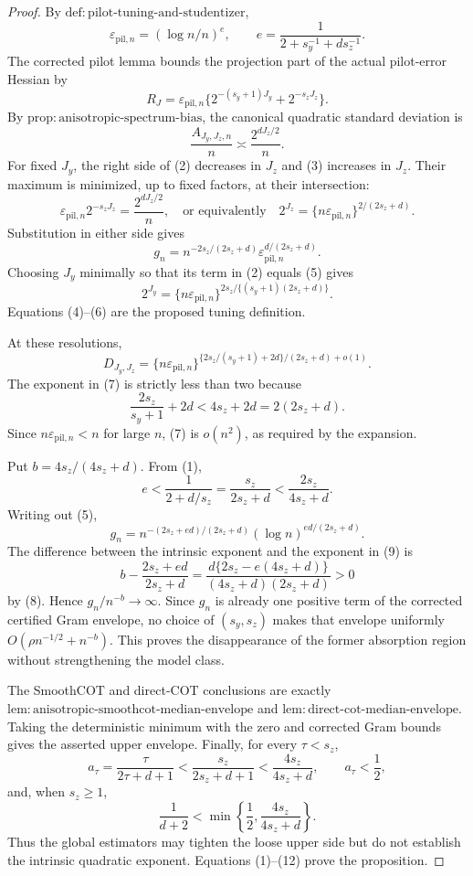 \documentclass{article}
\begin{document}
\begin{proof}
By \(\mathrm{def{:}pilot\text{-}tuning\text{-}and\text{-}studentizer}\),
\[
\varepsilon_{\mathrm{pil},n}=(\log n/n)^e,
\qquad
e=\frac1{2+s_y^{-1}+ds_z^{-1}}.                                 \tag{1}
\]
The corrected pilot lemma bounds the projection part of the actual pilot-error Hessian by
\[
R_J=\varepsilon_{\mathrm{pil},n}
\{2^{-(s_y+1)J_y}+2^{-s_zJ_z}\}.                               \tag{2}
\]
By \(\mathrm{prop{:}anisotropic\text{-}spectrum\text{-}bias}\), the canonical quadratic standard deviation is
\[
\frac{A_{J_y,J_z,n}}n\asymp\frac{2^{dJ_z/2}}n.                 \tag{3}
\]
For fixed \(J_y\), the right side of (2) decreases in \(J_z\) and (3) increases in \(J_z\). Their maximum is minimized, up to fixed factors, at their intersection:
\[
\varepsilon_{\mathrm{pil},n}2^{-s_zJ_z}
=\frac{2^{dJ_z/2}}n,
\quad\text{or equivalently}\quad
2^{J_z}=\{n\varepsilon_{\mathrm{pil},n}\}^{2/(2s_z+d)}.        \tag{4}
\]
Substitution in either side gives
\[
g_n=n^{-2s_z/(2s_z+d)}
\varepsilon_{\mathrm{pil},n}^{d/(2s_z+d)}.                      \tag{5}
\]
Choosing \(J_y\) minimally so that its term in (2) equals (5) gives
\[
2^{J_y}=\{n\varepsilon_{\mathrm{pil},n}\}^{2s_z/\{(s_y+1)(2s_z+d)\}}. \tag{6}
\]
Equations (4)--(6) are the proposed tuning definition.

At these resolutions,
\[
D_{J_y,J_z}
=\{n\varepsilon_{\mathrm{pil},n}\}^{\{2s_z/(s_y+1)+2d\}/(2s_z+d)+o(1)}. \tag{7}
\]
The exponent in (7) is strictly less than two because
\[
\frac{2s_z}{s_y+1}+2d<4s_z+2d=2(2s_z+d).
\]
Since \(n\varepsilon_{\mathrm{pil},n}<n\) for large \(n\), (7) is \(o(n^2)\), as required by the expansion.

Put \(b=4s_z/(4s_z+d)\). From (1),
\[
e<\frac1{2+d/s_z}=\frac{s_z}{2s_z+d}
<\frac{2s_z}{4s_z+d}.                                          \tag{8}
\]
Writing out (5),
\[
g_n=n^{-(2s_z+ed)/(2s_z+d)}
(\log n)^{ed/(2s_z+d)}.                                         \tag{9}
\]
The difference between the intrinsic exponent and the exponent in (9) is
\[
b-\frac{2s_z+ed}{2s_z+d}
=\frac{d\{2s_z-e(4s_z+d)\}}{(4s_z+d)(2s_z+d)}>0                \tag{10}
\]
by (8). Hence \(g_n/n^{-b}\to\infty\). Since \(g_n\) is already one positive term of the corrected certified Gram envelope, no choice of \((s_y,s_z)\) makes that envelope uniformly \(O(\rho n^{-1/2}+n^{-b})\). This proves the disappearance of the former absorption region without strengthening the model class.

The SmoothCOT and direct-COT conclusions are exactly \(\mathrm{lem{:}anisotropic\text{-}smoothcot\text{-}median\text{-}envelope}\) and \(\mathrm{lem{:}direct\text{-}cot\text{-}median\text{-}envelope}\). Taking the deterministic minimum with the zero and corrected Gram bounds gives the asserted upper envelope. Finally, for every \(\tau<s_z\),
\[
a_\tau=\frac{\tau}{2\tau+d+1}
<\frac{s_z}{2s_z+d+1}<\frac{4s_z}{4s_z+d},
\qquad a_\tau<\frac12,                                         \tag{11}
\]
and, when \(s_z\ge1\),
\[
\frac1{d+2}<\min\!\left\{\frac12,\frac{4s_z}{4s_z+d}\right\}. \tag{12}
\]
Thus the global estimators may tighten the loose upper side but do not establish the intrinsic quadratic exponent. Equations (1)--(12) prove the proposition.
\end{proof}
\end{document}
